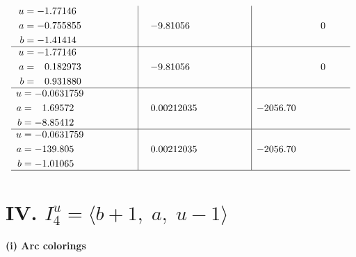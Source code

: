 \documentclass[1p]{elsarticle_modified}
\theoremstyle{definition}
\begin{document}
$$\begin{array}{c|c|c}
\begin{aligned}
u &= -1.77146\phantom{ +0.000000I} \\
a &= -0.755855\phantom{ +0.000000I} \\
b &= -1.41414\phantom{ +0.000000I}\end{aligned}
 & -9.81056\phantom{ +0.000000I} & \phantom{-0.000000 } 0 \\ \hline\begin{aligned}
u &= -1.77146\phantom{ +0.000000I} \\
a &= \phantom{-}0.182973\phantom{ +0.000000I} \\
b &= \phantom{-}0.931880\phantom{ +0.000000I}\end{aligned}
 & -9.81056\phantom{ +0.000000I} & \phantom{-0.000000 } 0 \\ \hline\begin{aligned}
u &= -0.0631759\phantom{ +0.000000I} \\
a &= \phantom{-}1.69572\phantom{ +0.000000I} \\
b &= -8.85412\phantom{ +0.000000I}\end{aligned}
 & \phantom{-}0.00212035\phantom{ +0.000000I} & -2056.70\phantom{ +0.000000I} \\ \hline\begin{aligned}
u &= -0.0631759\phantom{ +0.000000I} \\
a &= -139.805\phantom{ +0.000000I} \\
b &= -1.01065\phantom{ +0.000000I}\end{aligned}
 & \phantom{-}0.00212035\phantom{ +0.000000I} & -2056.70\phantom{ +0.000000I}\\
 \hline 
 \end{array}$$\newpage\newpage\renewcommand{\arraystretch}{1}
\centering \section*{IV. $I^u_{4}= \langle b+1,\;a,\;u-1 \rangle$}
\flushleft \textbf{(i) Arc colorings}\\
\end{document}
